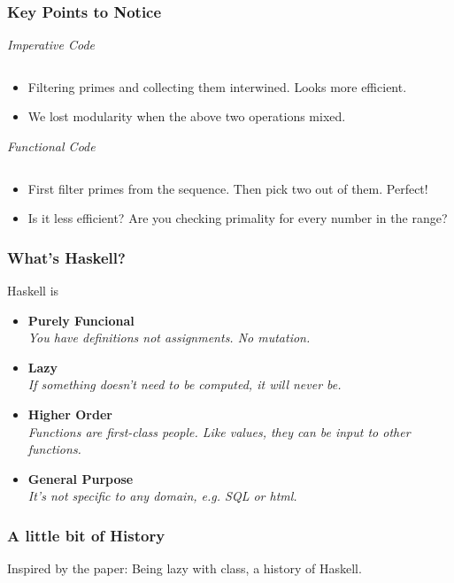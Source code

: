 \documentclass{beamer}
\begin{document}
\begin{frame}[fragile,t]
  \frametitle{Key Points to Notice}

  \begin{multicols}{2}
    \emph{Imperative Code}
    \inputminted[frame=lines,fontsize=\tiny]{c}{code/slides/primes.c}

    \begin{itemize}
    \item Filtering primes and collecting them interwined. Looks more efficient.
    \item We lost modularity when the above two operations mixed.
    \end{itemize}

    \columnbreak

    \emph{Functional Code}
    \inputminted[frame=lines,fontsize=\tiny]{haskell}{code/slides/Primes.hs}

    \begin{itemize}
    \item First filter primes from the sequence. Then pick two out of them. Perfect!
    \item Is it less efficient? Are you checking primality for every number in the range?
    \end{itemize}

  \end{multicols}
  \vfill

\end{frame}

\begin{frame}[t]
  \frametitle{What's Haskell?}

  Haskell is
  \begin{itemize}
  \item{\bf Purely Funcional} \\
    \textit{You have definitions not assignments. No mutation.}

  \item{\bf Lazy} \\
    \textit{If something doesn't need to be computed, it will never be.}

  \item{\bf Higher Order} \\
    \textit{Functions are first-class people. Like values, they can be input to other functions.}

  \item{\bf General Purpose} \\
    \textit{It's not specific to any domain, e.g. SQL or html.}

  \end{itemize}
\end{frame}

\begin{frame}[t]
  \frametitle{A little bit of History}
  Inspired by the paper: Being lazy with class, a history of Haskell.


\end{frame}

\begin{frame}[t]

\end{frame}
\end{document}
